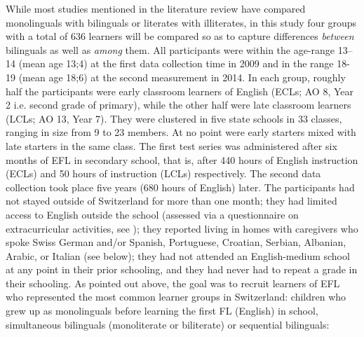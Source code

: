 \documentclass[output=paper,modfonts,nonflat,newtxmath]{langsci/langscibook}
\begin{document}
While most studies mentioned in the literature review have compared monolinguals with bilinguals or literates with illiterates, in this study four groups with a total of 636 learners will be compared so as to capture differences \textit{between} bilinguals as well as \textit{among} them. All participants were within the age-range 13--14 (mean age 13;4) at the first data collection time in 2009 and in the range 18-19 (mean age 18;6) at the second measurement in 2014. In each group, roughly half the participants were early classroom learners of English (ECLs; AO 8, Year 2 i.e. second grade of primary), while the other half were late classroom learners (LCLs; AO 13, Year 7). They were clustered in five state schools in 33 classes, ranging in size from 9 to 23 members. At no point were early starters mixed with late starters in the same class. The first test series was administered after six months of EFL in secondary school, that is, after 440 hours of English instruction (ECLs) and 50 hours of instruction (LCLs) respectively. The second data collection took place five years (680 hours of English) later. The participants had not stayed outside of Switzerland for more than one month; they had limited access to English outside the school (assessed via a questionnaire on extracurricular activities, see \citealt{PfenningerSingleton2017}); they reported living in homes with caregivers who spoke Swiss German and/or Spanish, Portuguese, Croatian, Serbian, Albanian, Arabic, or Italian (see below); they had not attended an English-medium school at any point in their prior schooling,  and they had never had to repeat a grade in their schooling. As pointed out above, the goal was to recruit learners of EFL who represented the most common learner groups in Switzerland: children who grew up as monolinguals before learning the first FL (English) in school, simultaneous bilinguals (monoliterate or biliterate) or sequential bilinguals:
\end{document}
